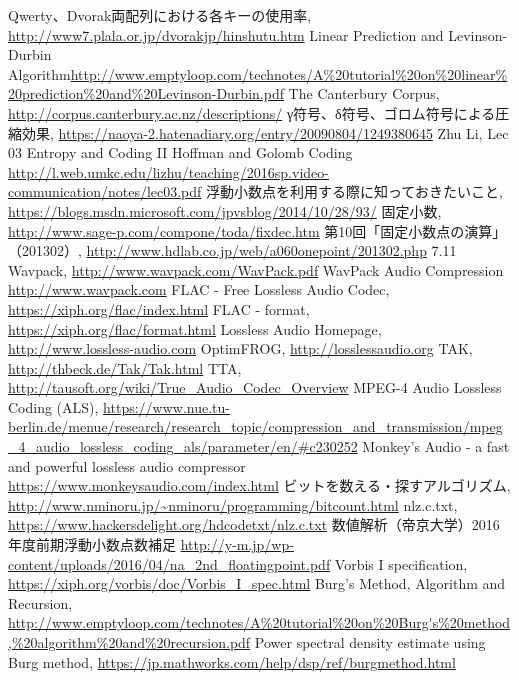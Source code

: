 \documentclass[uplatex,dvipdfmx,b5j,10pt]{jsbook}
\theoremstyle{definition}
\begin{document}
\begin{thebibliography}{99}
 Qwerty、Dvorak両配列における各キーの使用率, \url{http://www7.plala.or.jp/dvorakjp/hinshutu.htm}
 Linear Prediction and Levinson-Durbin Algorithm\url{http://www.emptyloop.com/technotes/A\%20tutorial\%20on\%20linear\%20prediction\%20and\%20Levinson-Durbin.pdf}
 The Canterbury Corpus, \url{http://corpus.canterbury.ac.nz/descriptions/}
 γ符号、δ符号、ゴロム符号による圧縮効果, \url{https://naoya-2.hatenadiary.org/entry/20090804/1249380645}
 Zhu Li, Lec 03 Entropy and Coding II Hoffman and Golomb Coding \url{http://l.web.umkc.edu/lizhu/teaching/2016sp.video-communication/notes/lec03.pdf}
 浮動小数点を利用する際に知っておきたいこと, \url{https://blogs.msdn.microsoft.com/jpvsblog/2014/10/28/93/}
 固定小数, \url{http://www.sage-p.com/compone/toda/fixdec.htm}
 第10回「固定小数点の演算」（201302）, \url{http://www.hdlab.co.jp/web/a060onepoint/201302.php}
 7.11 Wavpack, \url{http://www.wavpack.com/WavPack.pdf}
 WavPack Audio Compression \url{http://www.wavpack.com}
 FLAC - Free Lossless Audio Codec, \url{https://xiph.org/flac/index.html}
 FLAC - format, \url{https://xiph.org/flac/format.html}
 Lossless Audio Homepage, \url{http://www.lossless-audio.com}
 OptimFROG, \url{http://losslessaudio.org}
 TAK, \url{http://thbeck.de/Tak/Tak.html}
 TTA, \url{http://tausoft.org/wiki/True_Audio_Codec_Overview}
 MPEG-4 Audio Lossless Coding (ALS), \url{https://www.nue.tu-berlin.de/menue/research/research_topic/compression_and_transmission/mpeg_4_audio_lossless_coding_als/parameter/en/#c230252}
 Monkey's Audio - a fast and powerful lossless audio compressor \url{https://www.monkeysaudio.com/index.html}
 ビットを数える・探すアルゴリズム, \url{http://www.nminoru.jp/~nminoru/programming/bitcount.html}
 nlz.c.txt, \url{https://www.hackersdelight.org/hdcodetxt/nlz.c.txt}
 数値解析（帝京大学）2016年度前期浮動⼩数点数補⾜ \url{http://y-m.jp/wp-content/uploads/2016/04/na_2nd_floatingpoint.pdf}
 Vorbis I specification, \url{https://xiph.org/vorbis/doc/Vorbis_I_spec.html}
 Burg’s Method, Algorithm and Recursion, \url{http://www.emptyloop.com/technotes/A%20tutorial%20on%20Burg's%20method,%20algorithm%20and%20recursion.pdf}
 Power spectral density estimate using Burg method, \url{https://jp.mathworks.com/help/dsp/ref/burgmethod.html}

\end{thebibliography}
\end{document}
